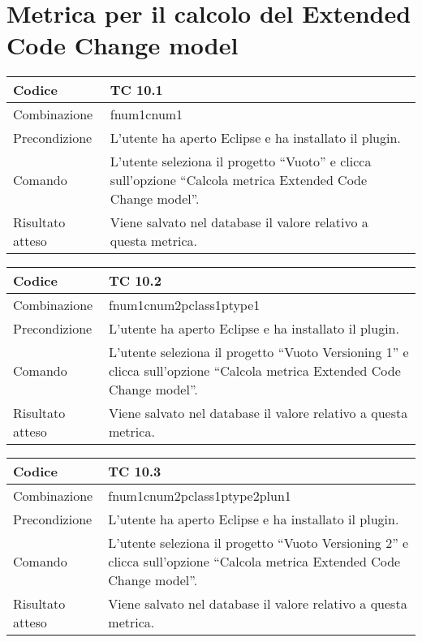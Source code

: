 \clearpage

\section{Metrica per il calcolo del Extended Code Change model}

\begin{table}[ht]
\begin{tabular}{|p{3cm}|p{9cm}|}
\hline
\cellcolor{lightgray}Codice				& TC 10.1								\\
\hline
\cellcolor{lightgray}Combinazione		& fnum1cnum1									\\
\hline
\cellcolor{lightgray}Precondizione		& L'utente ha aperto Eclipse e ha installato il plugin.		\\
\hline
\cellcolor{lightgray}Comando			& L'utente seleziona il progetto ``Vuoto''  e clicca sull'opzione ``Calcola metrica Extended Code Change model''.	\\
\hline
\cellcolor{lightgray}Risultato atteso	& Viene salvato nel database il valore relativo a questa metrica.\\
\hline
\end{tabular}
\end{table}


\begin{table}[ht]
\begin{tabular}{|p{3cm}|p{9cm}|}
\hline
\cellcolor{lightgray}Codice				& TC 10.2								\\
\hline
\cellcolor{lightgray}Combinazione		& fnum1cnum2pclass1ptype1									\\
\hline
\cellcolor{lightgray}Precondizione		& L'utente ha aperto Eclipse e ha installato il plugin.		\\
\hline
\cellcolor{lightgray}Comando			& L'utente seleziona il progetto ``Vuoto Versioning 1''  e clicca sull'opzione ``Calcola metrica Extended Code Change model''.	\\
\hline
\cellcolor{lightgray}Risultato atteso	& Viene salvato nel database il valore relativo a questa metrica.\\
\hline
\end{tabular}
\end{table}


\begin{table}[ht]
\begin{tabular}{|p{3cm}|p{9cm}|}
\hline
\cellcolor{lightgray}Codice				& TC 10.3								\\
\hline
\cellcolor{lightgray}Combinazione		& fnum1cnum2pclass1ptype2plun1									\\
\hline
\cellcolor{lightgray}Precondizione		& L'utente ha aperto Eclipse e ha installato il plugin.		\\
\hline
\cellcolor{lightgray}Comando			& L'utente seleziona il progetto ``Vuoto Versioning 2''  e clicca sull'opzione ``Calcola metrica Extended Code Change model''.	\\
\hline
\cellcolor{lightgray}Risultato atteso	& Viene salvato nel database il valore relativo a questa metrica.\\
\hline
\end{tabular}
\end{table}


